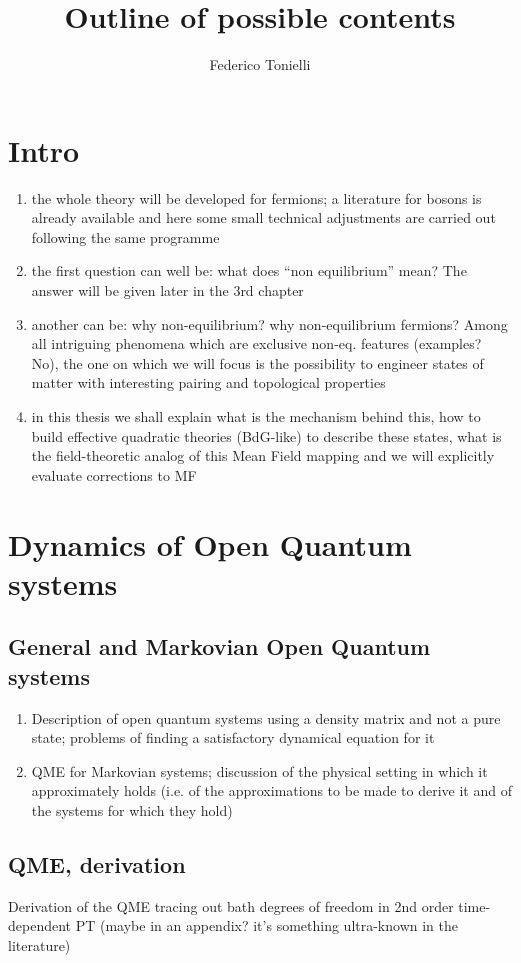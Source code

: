 \documentclass[a4paper,10pt]{article}
\title{Outline of possible contents}
\author{Federico Tonielli}
\theoremstyle{remark}
\newcommand{\nsec}{\vskip 0.8cm}
\begin{document}
 

 \section{Intro}
  \begin{enumerate}
   \item the whole theory will be developed for fermions; a literature for bosons is already available and here some small technical adjustments are carried out following the same programme
   \item the first question can well be: what does ``non equilibrium'' mean? The answer will be given later in the 3rd chapter
   \item another can be: why non-equilibrium? why non-equilibrium fermions? Among all intriguing phenomena which are exclusive non-eq. features (examples? No), the one on which we will focus is the possibility to engineer states of matter with interesting pairing and topological properties 
   \item in this thesis we shall explain what is the mechanism behind this, how to build effective quadratic theories (BdG-like) to describe these states, what is the field-theoretic analog of this Mean Field mapping and we will explicitly evaluate corrections to MF
  \end{enumerate}
 \nsec
 
 \section{Dynamics of Open Quantum systems}
  \subsection{General and Markovian Open Quantum systems}
   \begin{enumerate}
    \item Description of open quantum systems using a density matrix and not a pure state; problems of finding a satisfactory dynamical equation for it
    \item QME for Markovian systems; discussion of the physical setting in which it approximately holds (i.e. of the approximations to be made to derive it and of the systems for which they hold)
   \end{enumerate}
  \subsection{QME, derivation}
   Derivation of the QME tracing out bath degrees of freedom in 2nd order time-dependent PT (maybe in an appendix? it's something ultra-known in the literature) 
 \nsec  
 
\end{document}

